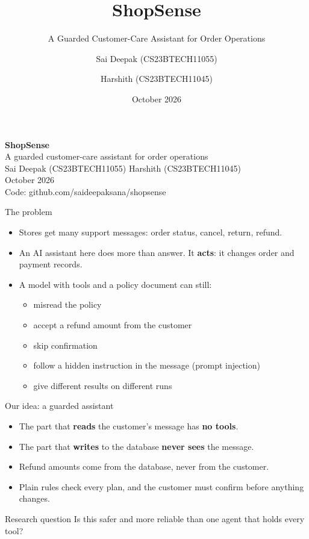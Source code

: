 \documentclass[aspectratio=169,12pt]{beamer}
\title{ShopSense}
\subtitle{A Guarded Customer-Care Assistant for Order Operations}
\author{Sai Deepak (CS23BTECH11055) \and Harshith (CS23BTECH11045)}
\date{October 2026}
\begin{document}
\begin{frame}[plain]
\vspace{12mm}
{\color{accent}\fontsize{34}{38}\selectfont\bfseries ShopSense}\\[3mm]
{\Large A guarded customer-care assistant for order operations}\\[8mm]
Sai Deepak (CS23BTECH11055) \quad Harshith (CS23BTECH11045)\\[1mm]
{\small October 2026}\\[8mm]
{\small Code: github.com/saideepaksana/shopsense}
\end{frame}

\begin{frame}{The problem}
\begin{itemize}\setlength{\itemsep}{6pt}
  \item Stores get many support messages: order status, cancel, return, refund.
  \item An AI assistant here does more than answer. It \textbf{acts}: it changes order and payment records.
  \item A model with tools and a policy document can still:
  \begin{itemize}
    \item misread the policy
    \item accept a refund amount from the customer
    \item skip confirmation
    \item follow a hidden instruction in the message (prompt injection)
    \item give different results on different runs
  \end{itemize}
\end{itemize}
\end{frame}

\begin{frame}{Our idea: a guarded assistant}
\begin{itemize}\setlength{\itemsep}{8pt}
  \item The part that \textbf{reads} the customer's message has \textbf{no tools}.
  \item The part that \textbf{writes} to the database \textbf{never sees} the message.
  \item Refund amounts come from the database, never from the customer.
  \item Plain rules check every plan, and the customer must confirm before anything changes.
\end{itemize}
\vspace{3mm}
\begin{block}{Research question}
Is this safer and more reliable than one agent that holds every tool?
\end{block}
\end{frame}
\end{document}

